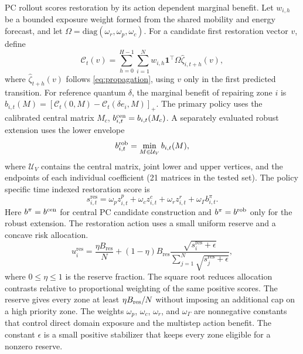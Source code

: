 \documentclass[journal]{IEEEtran}
\begin{document}
PC rollout scores restoration by its action dependent marginal benefit.  Let
$w_{i,h}$ be a bounded exposure weight formed from the shared mobility and
energy forecast, and let $\Omega=\mathrm{diag}(\omega_r,\omega_p,\omega_c)$.
For a candidate first restoration vector $v$, define
\begin{equation}
\mathcal{C}_t(v)=\sum_{h=0}^{H-1}\sum_{i=1}^{N}
 w_{i,h}\mathbf{1}^{\top}\Omega\hat\zeta_{i,t+h}(v),
\label{eq:envelope}
\end{equation}
where $\hat\zeta_{t+h}(v)$ follows \eqref{eq:propagation}, using $v$ only in the
first predicted transition.  For reference quantum $\delta$, the marginal
benefit of repairing zone $i$ is
$b_{i,t}(M)=[\mathcal{C}_t(0,M)-\mathcal{C}_t(\delta e_i,M)]_+$.  The primary
policy uses the calibrated central matrix $M_c$,
$b_{i,t}^{\rm cen}=b_{i,t}(M_c)$.  A separately evaluated robust extension uses
the lower envelope
\begin{equation}
b_{i,t}^{\rm rob}=\min_{M\in\mathcal U_V} b_{i,t}(M),
\end{equation}
where $\mathcal U_V$ contains the central matrix, joint lower and upper
vertices, and the endpoints of each individual coefficient (21 matrices in the
tested set).  The policy specific time indexed restoration score is
\begin{equation}
s_{i,t}^{\mathrm{res}}=
\omega_pz_{i,t}^{p}+\omega_cz_{i,t}^{c}+\omega_rz_{i,t}^{r}
+\omega_{\Gamma}b_{i,t}^{\pi}.
\end{equation}
Here $b^{\pi}=b^{\rm cen}$ for central PC candidate construction and
$b^{\pi}=b^{\rm rob}$ only for the robust extension.
The restoration action uses a small uniform reserve and a concave risk
allocation.
\begin{equation}
u_i^{\mathrm{res}}=
\frac{\eta B_{\mathrm{res}}}{N}
+(1-\eta)B_{\mathrm{res}}
\frac{\sqrt{s_i^{\mathrm{res}}+\epsilon}}
{\sum_{j=1}^{N}\sqrt{s_j^{\mathrm{res}}+\epsilon}},
\label{eq:allocation}
\end{equation}
where $0\le\eta\le1$ is the reserve fraction.  The square root reduces
allocation contrasts relative to proportional weighting of the same positive
scores.  The reserve gives every zone at least $\eta B_{\rm res}/N$ without
imposing an additional cap on a high priority zone.
The weights $\omega_p$, $\omega_c$, $\omega_r$, and $\omega_{\Gamma}$ are
nonnegative constants that control direct domain exposure and the multistep
action benefit.  The constant $\epsilon$ is a small positive stabilizer that
keeps every zone eligible for a nonzero reserve.
\end{document}
